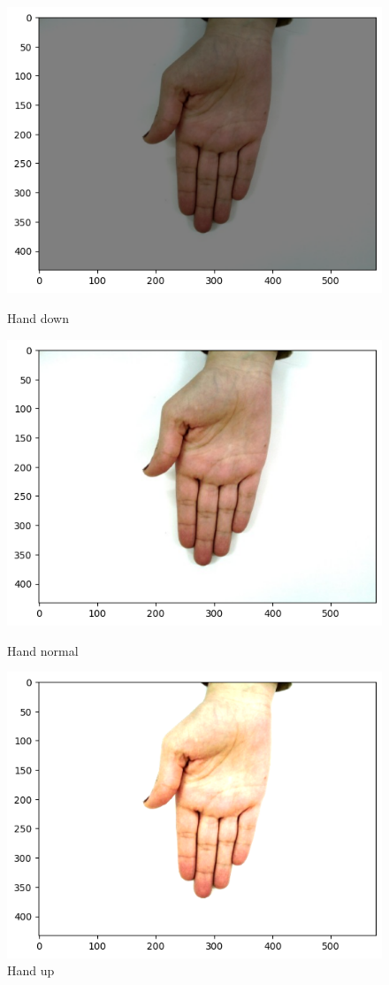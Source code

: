 \documentclass{report}
\begin{document}
\begin{figure}[H]
    \includegraphics[width=\linewidth]{Images/hand_down.png}
    \caption{Hand down}
  \endminipage\hfill
    \includegraphics[width=\linewidth]{Images/hand_normal.png}
    \caption{Hand normal}
  \endminipage\hfill
    \includegraphics[width=\linewidth]{Images/hand_up.png}
    \caption{Hand up}
  \endminipage\hfill
\end{figure}
\end{document}
